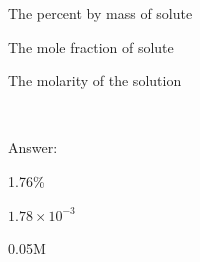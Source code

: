 \documentclass[main.tex]{subfiles}
\begin{document}
\begin{description}
\begin{example}
\begin{inparaenum}[(a)]	
\item The percent by mass of solute  
\item	 The mole fraction of solute  
\item  The molarity of the solution	 
\end{inparaenum}\\
\begin{flushright} Answer: \begin{inparaenum}[(a)]	
\item  1.76\%
\item	  $1.78\times 10^{-3}$
\item   0.05M
\end{inparaenum}\end{flushright}
\end{example}%


\end{description}
\end{document}

